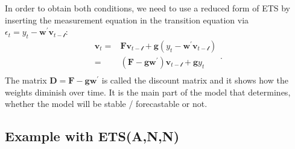 \documentclass[
]{book}
\theoremstyle{definition}
\theoremstyle{definition}
\theoremstyle{definition}
\theoremstyle{definition}
\theoremstyle{remark}
\begin{document}
In order to obtain both conditions, we need to use a reduced form of ETS by inserting the measurement equation in the transition equation via \(\epsilon_t= {y}_{t} - \mathbf{w}^\prime \mathbf{v}_{t-\boldsymbol{\mathscr{l}}}\):
\begin{equation}
  \begin{aligned}
    \mathbf{v}_{t} = &\mathbf{F} \mathbf{v}_{t-\boldsymbol{\mathscr{l}}} + \mathbf{g} \left({y}_{t} - \mathbf{w}^\prime \mathbf{v}_{t-\boldsymbol{\mathscr{l}}} \right)\\
    = & \left(\mathbf{F} - \mathbf{g}\mathbf{w}^\prime \right) \mathbf{v}_{t-\boldsymbol{\mathscr{l}}} + \mathbf{g} {y}_{t} \\
  \end{aligned}.
  \label{eq:ETSADAMStateSpacePureAdditiveBackRecursion01}
\end{equation}
The matrix \(\mathbf{D}=\mathbf{F} - \mathbf{g}\mathbf{w}^\prime\) is called the discount matrix and it shows how the weights diminish over time. It is the main part of the model that determines, whether the model will be stable / forecastable or not.

\hypertarget{example-with-etsann-1}{%
\subsection{Example with ETS(A,N,N)}\label{example-with-etsann-1}}
\end{document}

